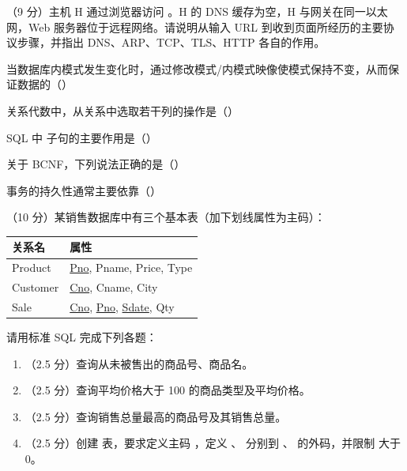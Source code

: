 \documentclass[a4paper,11pt]{article}
\begin{document}
\q （9 分）主机 H 通过浏览器访问 。H 的 DNS 缓存为空，H 与网关在同一以太网，Web 服务器位于远程网络。请说明从输入 URL 到收到页面所经历的主要协议步骤，并指出 DNS、ARP、TCP、TLS、HTTP 各自的作用。
\anslines{8cm}



\q 当数据库内模式发生变化时，通过修改模式/内模式映像使模式保持不变，从而保证数据的（\quad）

\q 关系代数中，从关系中选取若干列的操作是（\quad）

\q SQL 中  子句的主要作用是（\quad）

\q 关于 BCNF，下列说法正确的是（\quad）

\q 事务的持久性通常主要依靠（\quad）


\q （10 分）某销售数据库中有三个基本表（加下划线属性为主码）：
\begin{center}\small
\begin{tabular}{ll}
\toprule
关系名 & 属性 \\
\midrule
Product & \underline{Pno}, Pname, Price, Type \\
Customer & \underline{Cno}, Cname, City \\
Sale & \underline{Cno}, \underline{Pno}, \underline{Sdate}, Qty \\
\bottomrule
\end{tabular}
\end{center}
请用标准 SQL 完成下列各题：
\begin{enumerate}[label=（\arabic*）, leftmargin=2.4em, itemsep=1pt]
  \item （2.5 分）查询从未被售出的商品号、商品名。
  \item （2.5 分）查询平均价格大于 100 的商品类型及平均价格。
  \item （2.5 分）查询销售总量最高的商品号及其销售总量。
  \item （2.5 分）创建  表，要求定义主码 ，定义 、 分别到 、 的外码，并限制  大于 0。
\end{enumerate}
\anslines{9cm}
\end{document}
